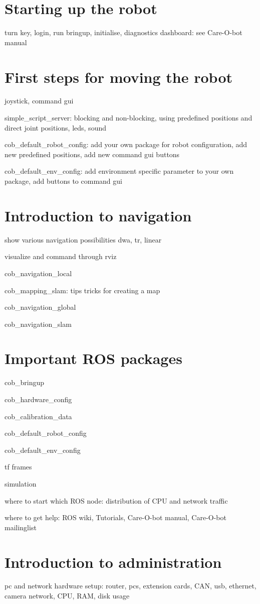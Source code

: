 \documentclass[12pt,twoside]{report}
\begin{document}
\section{Starting up the robot}
turn key, login, run bringup, initialise, diagnostics dashboard: see Care-O-bot manual

\section{First steps for moving the robot}
joystick, command gui

simple\_script\_server: blocking and non-blocking, using predefined positions and direct joint positions, leds, sound

cob\_default\_robot\_config: add your own package for robot configuration, add new predefined positions, add new command gui buttons

cob\_default\_env\_config: add environment specific parameter to your own package, add buttons to command gui

\section{Introduction to navigation}
show various navigation possibilities dwa, tr, linear

visualize and command through rviz

cob\_navigation\_local

cob\_mapping\_slam: tips tricks for creating a map

cob\_navigation\_global

cob\_navigation\_slam

\section{Important ROS packages}
cob\_bringup

cob\_hardware\_config

cob\_calibration\_data

cob\_default\_robot\_config

cob\_default\_env\_config

tf frames

simulation

where to start which ROS node: distribution of CPU and network traffic

where to get help: ROS wiki, Tutorials, Care-O-bot manual, Care-O-bot mailinglist

\section{Introduction to administration}
pc and network hardware setup: router, pcs, extension cards, CAN, usb, ethernet, camera network, CPU, RAM, disk usage
\end{document}
